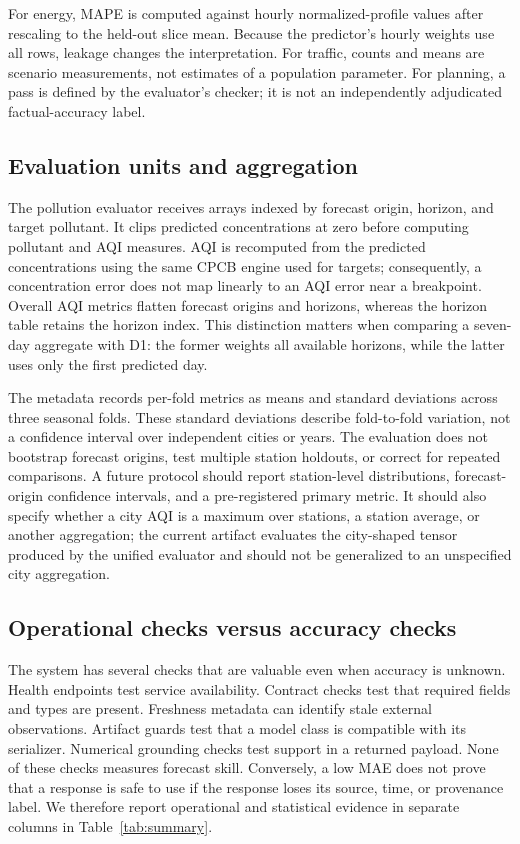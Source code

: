 \documentclass[conference]{IEEEtran}
\begin{document}
For energy, MAPE is computed against hourly normalized-profile values after rescaling to the held-out slice mean. Because the predictor's hourly weights use all rows, leakage changes the interpretation. For traffic, counts and means are scenario measurements, not estimates of a population parameter. For planning, a pass is defined by the evaluator's checker; it is not an independently adjudicated factual-accuracy label.

\subsection{Evaluation units and aggregation}
The pollution evaluator receives arrays indexed by forecast origin, horizon, and target pollutant. It clips predicted concentrations at zero before computing pollutant and AQI measures. AQI is recomputed from the predicted concentrations using the same CPCB engine used for targets; consequently, a concentration error does not map linearly to an AQI error near a breakpoint. Overall AQI metrics flatten forecast origins and horizons, whereas the horizon table retains the horizon index. This distinction matters when comparing a seven-day aggregate with D1: the former weights all available horizons, while the latter uses only the first predicted day.

The metadata records per-fold metrics as means and standard deviations across three seasonal folds. These standard deviations describe fold-to-fold variation, not a confidence interval over independent cities or years. The evaluation does not bootstrap forecast origins, test multiple station holdouts, or correct for repeated comparisons. A future protocol should report station-level distributions, forecast-origin confidence intervals, and a pre-registered primary metric. It should also specify whether a city AQI is a maximum over stations, a station average, or another aggregation; the current artifact evaluates the city-shaped tensor produced by the unified evaluator and should not be generalized to an unspecified city aggregation.

\subsection{Operational checks versus accuracy checks}
The system has several checks that are valuable even when accuracy is unknown. Health endpoints test service availability. Contract checks test that required fields and types are present. Freshness metadata can identify stale external observations. Artifact guards test that a model class is compatible with its serializer. Numerical grounding checks test support in a returned payload. None of these checks measures forecast skill. Conversely, a low MAE does not prove that a response is safe to use if the response loses its source, time, or provenance label. We therefore report operational and statistical evidence in separate columns in Table~\ref{tab:summary}.
\end{document}
